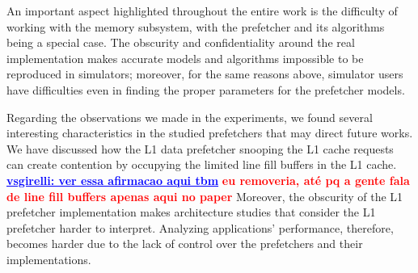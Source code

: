 \documentclass[AMA,final,STIX1COL]{WileyNJD-v2}
\newcommand{\vsg}[1]{\textcolor{blue}{\bfseries \ul{vsgirelli: #1} }\vspace{0.2cm}}
\begin{document}
An important aspect highlighted throughout the entire work is the difficulty of working with the memory subsystem, with the prefetcher and its algorithms being a special case.
The obscurity and confidentiality around the real implementation makes accurate models and algorithms impossible to be reproduced in simulators; moreover, for the same reasons above, simulator users have difficulties even in finding the proper parameters for the prefetcher models.

Regarding the observations we made in the experiments, we found several interesting characteristics in the studied prefetchers that may direct future works.
We have discussed how the L1 data prefetcher snooping the L1 cache requests can create contention by occupying the limited line fill buffers in the L1 cache.
\vsg{ver essa afirmacao aqui tbm} \textcolor{red}{\textbf{eu removeria, até pq a gente fala de line fill buffers apenas aqui no paper}}
Moreover, the obscurity of the L1 prefetcher implementation makes architecture studies that consider the L1 prefetcher harder to interpret.
Analyzing applications' performance, therefore, becomes harder due to the lack of control over the prefetchers and their implementations.
\end{document}
